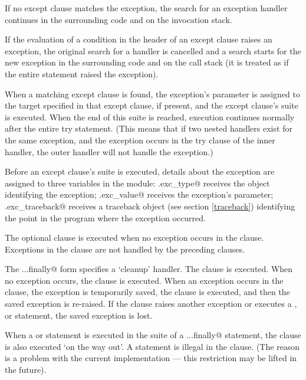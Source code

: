 If no except clause matches the exception, the search for an exception
handler continues in the surrounding code and on the invocation stack.

If the evaluation of a condition in the header of an except clause
raises an exception, the original search for a handler is cancelled
and a search starts for the new exception in the surrounding code and
on the call stack (it is treated as if the entire \verb@try@ statement
raised the exception).

When a matching except clause is found, the exception's parameter is
assigned to the target specified in that except clause, if present,
and the except clause's suite is executed.  When the end of this suite
is reached, execution continues normally after the entire try
statement.  (This means that if two nested handlers exist for the same
exception, and the exception occurs in the try clause of the inner
handler, the outer handler will not handle the exception.)

Before an except clause's suite is executed, details about the
exception are assigned to three variables in the \verb@sys@ module:
\verb@sys.exc_type@ receives the object identifying the exception;
\verb@sys.exc_value@ receives the exception's parameter;
\verb@sys.exc_traceback@ receives a traceback object (see section
\ref{traceback}) identifying the point in the program where the
exception occurred.

The optional \verb@else@ clause is executed when no exception occurs
in the \verb@try@ clause.  Exceptions in the \verb@else@ clause are
not handled by the preceding \verb@except@ clauses.

The \verb@try...finally@ form specifies a `cleanup' handler.  The
\verb@try@ clause is executed.  When no exception occurs, the
\verb@finally@ clause is executed.  When an exception occurs in the
\verb@try@ clause, the exception is temporarily saved, the
\verb@finally@ clause is executed, and then the saved exception is
re-raised.  If the \verb@finally@ clause raises another exception or
executes a \verb@return@, \verb@break@ or \verb@continue@ statement,
the saved exception is lost.

When a \verb@return@ or \verb@break@ statement is executed in the
\verb@try@ suite of a \verb@try...finally@ statement, the
\verb@finally@ clause is also executed `on the way out'.  A
\verb@continue@ statement is illegal in the \verb@try@ clause.  (The
reason is a problem with the current implementation --- this
restriction may be lifted in the future).


